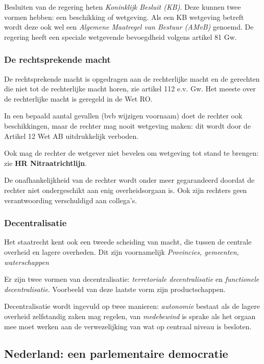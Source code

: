 \documentclass{article}
\begin{document}
Besluiten van de regering heten \emph{Koninklijk Besluit (KB)}. Deze kunnen twee
vormen hebben: een beschikking of wetgeving. Als een KB wetgeving betreft wordt deze
ook wel een \emph{Algemene Maatregel van Bestuur (AMvB)} genoemd. De regering
heeft een speciale wetgevende bevoegdheid volgens artikel 81 Gw.

\subsubsection{De rechtsprekende macht}

De rechtsprekende macht is opgedragen aan de rechterlijke macht en de gerechten
die niet tot de rechterlijke macht horen, zie artikel 112 e.v. Gw. Het meeste
over de rechterlijke macht is geregeld in de Wet RO.

In een bepaald aantal gevallen (bvb wijzigen voornaam) doet de rechter ook
beschikkingen, maar de rechter mag nooit wetgeving maken: dit wordt door de
Artikel 12 Wet AB uitdrukkelijk verboden.

Ook mag de rechter de wetgever niet bevelen om wetgeving tot stand te brengen:
zie \textbf{HR Nitraatrichtlijn}.

De onafhankelijkheid van de rechter wordt onder meer gegarandeerd doordat de
rechter niet ondergeschikt aan enig overheidsorgaan is. Ook zijn rechters geen
verantwoording verschuldigd aan collega's.

\subsubsection{Decentralisatie}

Het staatrecht kent ook een tweede scheiding van macht, die tussen de centrale
overheid en lagere overheden. Dit zijn voornamelijk \emph{Provincies,
gemeenten, waterschappen}

Er zijn twee vormen van decentralisatie: \emph{terretoriale decentralisatie} en
\emph{functionele decentralisatie}. Voorbeeld van deze laatste vorm zijn
productschappen.

Decentralisatie wordt ingevuld op twee manieren: \emph{autonomie} bestaat als
de lagere overheid zelfstandig zaken mag regelen, van \emph{medebewind} is
sprake als het orgaan mee moet werken aan de verwezelijking van wat op centraal
niveau is besloten.

\subsection{Nederland: een parlementaire democratie}
\end{document}
